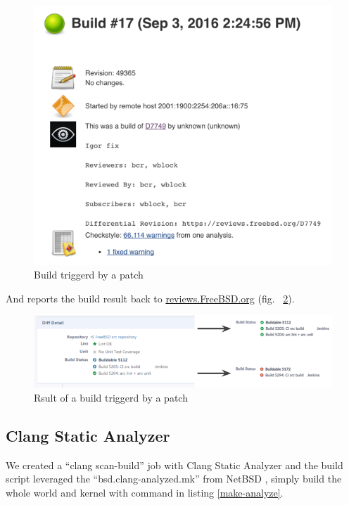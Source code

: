 \documentclass[a4paper,twocolumn,10pt]{article}
\begin{document}
\begin{figure}
\includegraphics{build-patch.png}
\caption{Build triggerd by a patch}
\label{build-patch}
\end{figure}

And reports the build result back to \url{reviews.FreeBSD.org} (fig.
~\ref{patch-build-result}).

\begin{figure}
\includegraphics[width=\textwidth]{patch-build-result.png}
\caption{Rsult of a build triggerd by a patch}
\label{patch-build-result}
\end{figure}

\subsection{Clang Static Analyzer}

We created a ``clang scan-build'' job with Clang Static Analyzer
\cite{clang-static-analyzer} and the build script leveraged the
``bsd.clang-analyzed.mk'' from NetBSD \cite{netbsd}, simply build the whole
world and kernel with command in listing \ref{make-analyze}.
\end{document}
